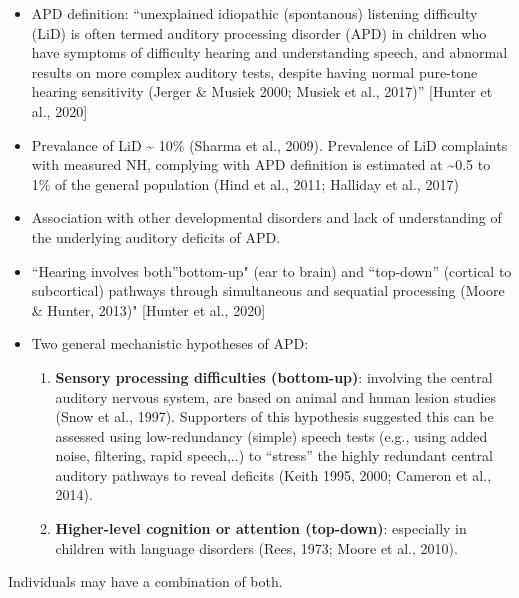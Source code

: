 \documentclass[a4paper, twoside]{templates/ociamthesis}
\providecommand{\tightlist}{%
  \setlength{\itemsep}{0pt}\setlength{\parskip}{0pt}}
\begin{document}
\begin{itemize}
\item
  APD definition: ``unexplained idiopathic (spontanous) listening difficulty (LiD) is often termed auditory processing disorder (APD) in children who have symptoms of difficulty hearing and understanding speech, and abnormal results on more complex auditory tests, despite having normal pure-tone hearing sensitivity (Jerger \& Musiek 2000; Musiek et al., 2017)'' {[}Hunter et al., 2020{]}
\item
  Prevalance of LiD \textasciitilde{} 10\% (Sharma et al., 2009). Prevalence of LiD complaints with measured NH, complying with APD definition is estimated at \textasciitilde0.5 to 1\% of the general population (Hind et al., 2011; Halliday et al., 2017)
\item
  Association with other developmental disorders and lack of understanding of the underlying auditory deficits of APD.
\item
  ``Hearing involves both''bottom-up" (ear to brain) and ``top-down'' (cortical to subcortical) pathways through simultaneous and sequatial processing (Moore \& Hunter, 2013)" {[}Hunter et al., 2020{]}
\item
  Two general mechanistic hypotheses of APD:

  \begin{enumerate}
  \def\labelenumi{(\arabic{enumi})}
  \tightlist
  \item
    \textbf{Sensory processing difficulties (bottom-up)}: involving the central auditory nervous system, are based on animal and human lesion studies (Snow et al., 1997). Supporters of this hypothesis suggested this can be assessed using low-redundancy (simple) speech tests (e.g., using added noise, filtering, rapid speech,..) to ``stress'' the highly redundant central auditory pathways to reveal deficits (Keith 1995, 2000; Cameron et al., 2014).
  \item
    \textbf{Higher-level cognition or attention (top-down)}: especially in children with language disorders (Rees, 1973; Moore et al., 2010).
  \end{enumerate}
\end{itemize}

Individuals may have a combination of both.
\end{document}
